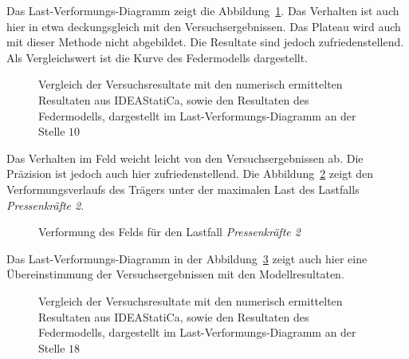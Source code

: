 \documentclass[
  11pt,
  letterpaper,
]{scrreprt}
\begin{document}
Das Last-Verformungs-Diagramm zeigt die
Abbildung~\ref{fig-p_w10_vergleich_idea}. Das Verhalten ist auch hier in
etwa deckungsgleich mit den Versuchsergebnissen. Das Plateau wird auch
mit dieser Methode nicht abgebildet. Die Resultate sind jedoch
zufriedenstellend. Als Vergleichswert ist die Kurve des Federmodells
dargestellt.

\begin{figure}[H]


\caption{\label{fig-p_w10_vergleich_idea}Vergleich der Versuchsresultate
mit den numerisch ermittelten Resultaten aus IDEAStatiCa, sowie den
Resultaten des Federmodells, dargestellt im Last-Verformungs-Diagramm an
der Stelle \(10\)}

\end{figure}%

Das Verhalten im Feld weicht leicht von den Versuchsergebnissen ab. Die
Präzision ist jedoch auch hier zufriedenstellend. Die
Abbildung~\ref{fig-def_feld_ideastat} zeigt den Verformungsverlaufs des
Trägers unter der maximalen Last des Lastfalls \emph{Pressenkräfte 2}.

\begin{figure}[H]


\caption{\label{fig-def_feld_ideastat}Verformung des Felds für den
Lastfall \emph{Pressenkräfte 2}}

\end{figure}%

Das Last-Verformungs-Diagramm in der
Abbildung~\ref{fig-q_w18_vergleich_idea} zeigt auch hier eine
Übereinstimmung der Versuchsergebnissen mit den Modellresultaten.

\begin{figure}[H]


\caption{\label{fig-q_w18_vergleich_idea}Vergleich der Versuchsresultate
mit den numerisch ermittelten Resultaten aus IDEAStatiCa, sowie den
Resultaten des Federmodells, dargestellt im Last-Verformungs-Diagramm an
der Stelle \(18\)}

\end{figure}%
\end{document}
